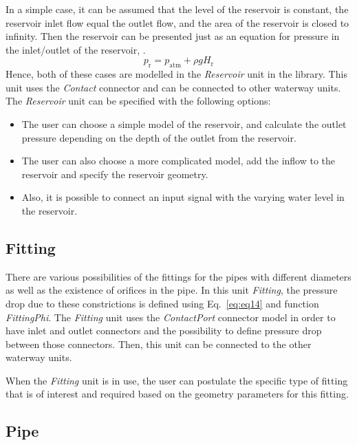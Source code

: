 \documentclass[%
]{USN-PhD}
\begin{document}
In a simple case, it can be assumed that the level of the reservoir is constant, the reservoir inlet flow equal the outlet flow, and the area of the reservoir is closed to infinity. Then the reservoir can be presented just as an equation for pressure in the inlet/outlet of the reservoir, \cite{Sha:11,Val:17}.
\begin{equation}
    p_\mathrm{r}=p_\mathrm{atm}+\rho gH_\mathrm{r}
\end{equation}
Hence, both of these cases are modelled in the \emph{Reservoir} unit in the library. This unit uses the \emph{Contact} connector and can be connected to other waterway units. The \emph{Reservoir} unit can be specified with the following options:
\begin{itemize}
    \item The user can choose a simple model of the reservoir, and calculate the outlet pressure depending on the depth of the outlet from the reservoir.
    \item The user can also choose a more complicated model, add the inflow to the reservoir and specify the reservoir geometry.
    \item Also, it is possible to connect an input signal with the varying water level in the reservoir.
\end{itemize}

\subsection{Fitting}

There are various possibilities of the fittings for the pipes with different diameters as well as the existence of orifices in the pipe. In this unit \emph{Fitting}, the pressure drop due to these constrictions is defined using Eq.~\ref{eq:eq14} and function \emph{FittingPhi}. The \emph{Fitting} unit uses the \emph{ContactPort} connector model in order to have inlet and outlet connectors and the possibility to define pressure drop between those connectors. Then, this unit can be connected to the other waterway units.

When the \emph{Fitting} unit is in use, the user can postulate the specific type of fitting that is of interest and required based on the geometry parameters for this fitting.

\subsection{Pipe}
\end{document}
